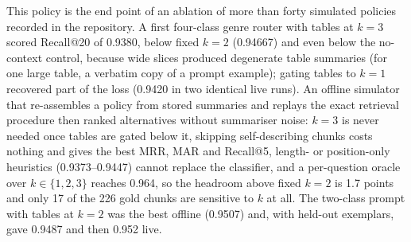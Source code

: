 \documentclass[pdflatex,sn-mathphys-num]{sn-jnl}
\makeatletter
\newif\ifprovenance
\newcommand{\verify}[1]{\ifprovenance\textcolor{red}{{\footnotesize [VERIFY: #1]}}\fi}
\newcommand{\Rec}[1]{Recall@#1}
\theoremstyle{thmstyleone}%
\theoremstyle{thmstylethree}%
\makeatother
\begin{document}
This policy is the end point of an ablation of more than forty simulated policies recorded in the repository. A first four-class genre router with tables at $k=3$ scored \Rec{20} of 0.9380, below fixed $k=2$ (0.94667) and even below the no-context control, because wide slices produced degenerate table summaries (for one large table, a verbatim copy of a prompt example); gating tables to $k=1$ recovered part of the loss (0.9420 in two identical live runs).\verify{\texttt{RnD/router\_prompt\_engineering.md} Sects.~1--2 and the committed output of \texttt{RnD/ablation\_dynamic\_doc\_slice\_generation.ipynb} / \texttt{benchmarking\_retrievals.ipynb} at git commit a888f5c; \texttt{real\_runs/tables1.json} and \texttt{tables1\_run2.json} under \texttt{RnD/dynamic\_slice\_length/router\_experiments/}; the four classes were boilerplate $\to$ no summary, self-contained exposition $\to k=1$, technical body $\to k=2$, fragment $\to k=3$} An offline simulator that re-assembles a policy from stored summaries and replays the exact retrieval procedure then ranked alternatives without summariser noise: $k=3$ is never needed once tables are gated below it, skipping self-describing chunks costs nothing and gives the best MRR, MAR and \Rec{5}, length- or position-only heuristics (0.9373--0.9447) cannot replace the classifier, and a per-question oracle over $k\in\{1,2,3\}$ reaches 0.964, so the headroom above fixed $k=2$ is 1.7 points and only 17 of the 226 gold chunks are sensitive to $k$ at all. The two-class prompt with tables at $k=2$ was the best offline (0.9507) and, with held-out exemplars, gave 0.9487 and then 0.952 live.\verify{all numbers of this paragraph are in \texttt{RnD/router\_prompt\_engineering.md}: Sect.~1 (headline table), Sect.~2 (diagnosis of the 0.9380 run), Sect.~3 (oracle 0.964 via \texttt{scripts/oracle.py} over \texttt{results/res\_ablation\_doc\_slice\_radius\_1..3.json}; 17 of 226 gold chunks $k$-sensitive), Sect.~4 (master table of every simulated policy, from \texttt{router\_experiments/results/sweep\_results.jsonl} via \texttt{scripts/make\_table.py}; rows \texttt{sim\_len\_*} and \texttt{sim\_pos\_*} for the heuristics; narrowing technical body text to $k=1$ costs 0.9 points), Sect.~4b (round-3 modifications) and Sect.~8 (exemplar re-sourcing); live-run records in \texttt{router\_experiments/real\_runs/*.json}}
\end{document}
